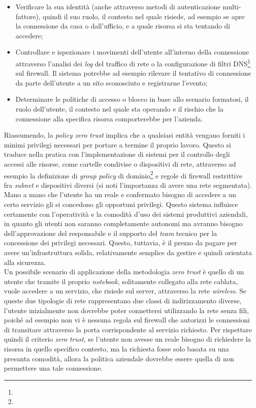 \documentclass[target=bach,aauheader=]{thud}
\begin{document}
\begin{itemize}
    \item Verificare la sua identità (anche attraverso metodi di autenticazione multi-fattore), quindi il suo ruolo, il contesto nel quale risiede, ad esempio se apre la connessione da casa o dall'ufficio, e a quale risorsa si sta tentando di accedere;
    \item Controllare e ispezionare i movimenti dell'utente all'interno della connessione attraverso l'analisi dei \textit{log} del traffico di rete o la configurazione di filtri DNS\footnote{} sul firewall. Il sistema potrebbe ad esempio rilevare il tentativo di connessione da parte dell'utente a un sito sconosciuto e registrarne l'evento;
    \item Determinare le politiche di accesso o blocco in base allo scenario formatosi, il ruolo dell'utente, il contesto nel quale sta operando e il rischio che la connessione alla specifica risorsa comporterebbe per l'azienda.
\end{itemize}

Riassumendo, la \textit{policy zero trust} implica che a qualsiasi entità vengano forniti i minimi privilegi necessari per portare a termine il proprio lavoro. Questo si traduce nella pratica con l'implementazione di sistemi per il controllo degli accessi alle risorse, come cartelle condivise o dispositivi di rete, attraverso ad esempio la definizione di \textit{group policy} di dominio\footnote{} e regole di firewall restrittive fra \textit{subnet} e dispositivi diversi (si noti l'importanza di avere una rete segmentata). Mano a mano che l'utente ha un reale e confermato bisogno di accedere a un certo servizio gli si concedono gli opportuni privilegi. Questo sistema influisce certamente con l'operatività e la comodità d'uso dei sistemi produttivi aziendali, in quanto gli utenti non saranno completamente autonomi ma avranno bisogno dell'approvazione del responsabile e il supporto del \textit{team} tecnico per la concessione dei privilegi necessari. Questo, tuttavia, è il prezzo da pagare per avere un'infrastruttura solida, relativamente semplice da gestire e quindi orientata alla sicurezza.
\\ Un possibile scenario di applicazione della metodologia \textit{zero trust} è quello di un utente che tramite il proprio \textit{notebook}, solitamente collegato alla rete cablata, vuole accedere a un servizio, che risiede sul server, attraverso la rete \textit{wireless}. Se queste due tipologie di rete rappresentano due classi di indirizzamento diverse, l'utente inizialmente non dovrebbe poter connettersi utilizzando la rete senza fili, poiché ad esempio non vi è nessuna regola sul firewall che autorizzi le connessioni di transitare attraverso la porta corrispondente al servizio richiesto. Per rispettare quindi il criterio \textit{zero trust}, se l'utente non avesse un reale bisogno di richiedere la risorsa in quello specifico contesto, ma la richiesta fosse solo basata su una presunta comodità, allora la politica aziendale dovrebbe essere quella di non permettere una tale connessione.
\end{document}

